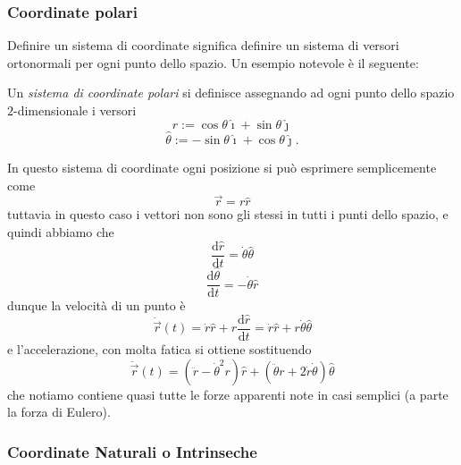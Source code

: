 \documentclass[11pt]{scrartcl}
\newcommand{\dif}{\text{d}}
\newcommand{\ihat}{\hat{\imath}}
\newcommand{\jhat}{\hat{\jmath}}
\begin{document}
	\subsubsection{Coordinate polari}
	Definire un sistema di coordinate significa definire un sistema di versori ortonormali per ogni punto dello spazio. Un esempio notevole è il seguente:
	\begin{definition}
		Un \textit{sistema di coordinate polari} si definisce assegnando ad ogni punto dello spazio $2$-dimensionale i versori
		$$\hat{r}:=\cos\theta \ihat +\sin  \theta \jhat$$
		$$\hat{\theta}:=-\sin\theta \ihat + \cos \theta \jhat.$$
	\end{definition}
	In questo sistema di coordinate ogni posizione si può esprimere semplicemente come
	$$\vec{r}=r \hat{r}$$
	tuttavia in questo caso i vettori non sono gli stessi in tutti i punti dello spazio, e quindi abbiamo che 
	$$\frac{\dif \hat{r}}{\dif t}=\dot{\theta}\hat{\theta}$$
	$$\frac{\dif \hat{\theta}}{\dif t}=-\dot{\theta}\hat{r}$$
	dunque la velocità di un punto è
	$$\dot{\vec{r}}(t)=\dot{r}\hat{r}+r\frac{\dif \hat{r}}{\dif t}=\dot{r}\hat{r}+r\dot{\theta}\hat{\theta}$$
	e l'accelerazione, con molta fatica si ottiene sostituendo 
	$$\ddot{\vec{r}}(t)=(\ddot{r}-\dot{\theta}^2r)\hat{r}+(\ddot{\theta}r+2\dot{r}\dot{\theta})\hat{\theta}$$
	che notiamo contiene quasi tutte le forze apparenti note in casi semplici (a parte la forza di Eulero).
	
	\subsubsection{Coordinate Naturali o Intrinseche}
	
\end{document}
